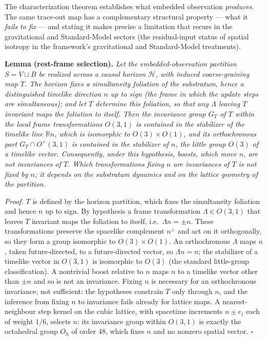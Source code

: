 \documentclass[
]{article}
\begin{document}
The characterization theorem establishes what embedded observation
\emph{produces}. The same trace-out map has a complementary structural
property --- what it \emph{fails to fix} --- and stating it makes
precise a limitation that recurs in the gravitational and Standard-Model
sectors (the residual-input status of spatial isotropy in the
framework's gravitational and Standard-Model treatments).

\textbf{Lemma (rest-frame selection).} \emph{Let the
embedded-observation partition \(S = V \sqcup B\) be realized across a
causal horizon \(\mathcal{H}\), with induced coarse-graining map \(T\).
The horizon fixes a simultaneity foliation of the substratum, hence a
distinguished timelike direction \(n\) up to sign (the frame in which
the update steps are simultaneous); and let \(T\) determine this
foliation, so that any \(\Lambda\) leaving \(T\) invariant maps the
foliation to itself. Then the invariance group \(G_T\) of \(T\) within
the local frame transformations \(O(3,1)\) is contained in the
stabilizer of the timelike line \(\mathbb{R}n\), which is isomorphic to
\(O(3)\times O(1)\), and its orthochronous part \(G_T \cap O^{+}(3,1)\)
is contained in the stabilizer of \(n\), the little group \(O(3)\) of a
timelike vector. Consequently, under this hypothesis, boosts, which move
\(n\), are not invariances of \(T\). Which transformations fixing \(n\)
are invariances of \(T\) is not fixed by \(n\); it depends on the
substratum dynamics and on the lattice geometry of the partition.}

\emph{Proof.} \(T\) is defined by the horizon partition, which fixes the
simultaneity foliation and hence \(n\) up to sign. By hypothesis a frame
transformation \(\Lambda \in O(3,1)\) that leaves \(T\) invariant maps
the foliation to itself, i.e.~\(\Lambda n = \pm n\). These
transformations preserve the spacelike complement \(n^{\perp}\) and act
on it orthogonally, so they form a group isomorphic to
\(O(3)\times O(1)\). An orthochronous \(\Lambda\) maps \(n\), taken
future-directed, to a future-directed vector, so \(\Lambda n = n\); the
stabilizer of a timelike vector in \(O(3,1)\) is isomorphic to \(O(3)\)
(the standard little-group classification). A nontrivial boost relative
to \(n\) maps \(n\) to a timelike vector other than \(\pm n\) and so is
not an invariance. Fixing \(n\) is necessary for an orthochronous
invariance, not sufficient: the hypotheses constrain \(T\) only through
\(n\), and the inference from fixing \(n\) to invariance fails already
for lattice maps. A nearest-neighbour step kernel on the cubic lattice,
with spacetime increments \(n \pm e_i\) each of weight \(1/6\), selects
\(n\): its invariance group within \(O(3,1)\) is exactly the octahedral
group \(O_h\) of order 48, which fixes \(n\) and no nonzero spatial
vector. \(\square\)
\end{document}
